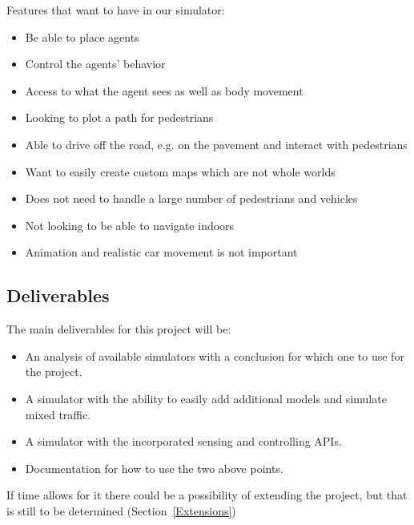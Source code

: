 
Features that want to have in our simulator: 
\begin{itemize}
\item Be able to place agents
\item Control the agents' behavior
\item Access to what the agent sees as well as body movement
\item Looking to plot a path for pedestrians
\item Able to drive off the road, e.g. on the pavement and interact with pedestrians
\item Want to easily create custom maps which are not whole worlds
\item Does not need to handle a large number of pedestrians and vehicles
\item Not looking to be able to navigate indoors
\item Animation and realistic car movement is not important
\end{itemize}

\subsection{Deliverables}
The main deliverables for this project will be:
\begin{itemize}
    \item An analysis of available simulators with a conclusion for which one to use for the project.
    \item A simulator with the ability to easily add additional models and simulate mixed traffic.
    \item A simulator with the incorporated sensing and controlling APIs.
    \item Documentation for how to use the two above points.
\end{itemize}
If time allows for it there could be a possibility of extending the project, but that is still to be determined (Section~\ref{Extensions}) 



